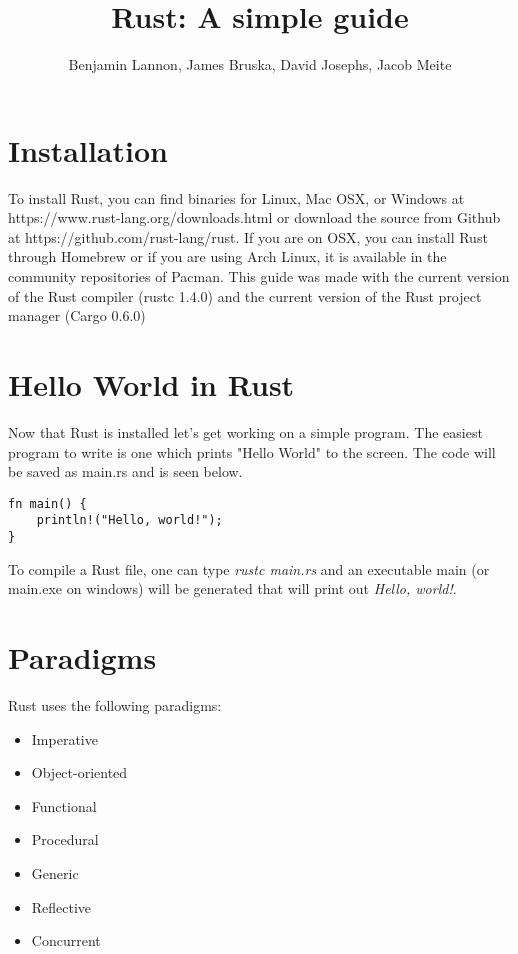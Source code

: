 \documentclass{article}
\title{Rust: A simple guide}
\author{Benjamin Lannon, James Bruska, David Josephs, Jacob Meite}
\begin{document}
\maketitle
\tableofcontents


\section{Installation}
To install Rust, you can find binaries for Linux, Mac OSX, or Windows at https://www.rust-lang.org/downloads.html or download the source from Github at https://github.com/rust-lang/rust. If you are on OSX, you can install Rust through Homebrew or if you are using Arch Linux, it is available in the community repositories of Pacman. This guide was made with the current version of the Rust compiler (rustc 1.4.0) and the current version of the Rust project manager (Cargo 0.6.0)

\section{Hello World in Rust}
Now that Rust is installed let's get working on a simple program. The easiest program to write is one which prints "Hello World" to the screen. The code will be saved as main.rs and is seen below.
\begin{lstlisting}
fn main() {
	println!("Hello, world!");
}
\end{lstlisting}

To compile a Rust file, one can type \emph{rustc main.rs} and an executable main (or main.exe on windows) will be generated that will print out \emph{Hello, world!}.

\section{Paradigms}
Rust uses the following paradigms:
\begin{multicols}{3}
\begin{itemize}
\item Imperative
\item Object-oriented
\item Functional
\item Procedural
\item Generic
\item Reflective
\item Concurrent
\end{itemize}
\end{multicols}
\end{document}
